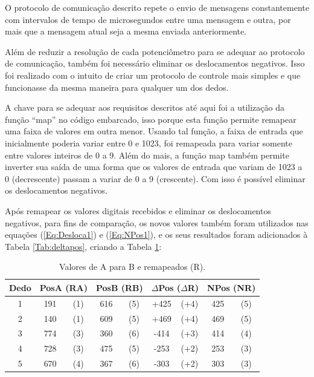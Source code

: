 \documentclass[
	12pt,				%
	openright,			%
	oneside,			%
	a4paper,			%
	english,			%
	brazil				%
	]{abntex2}
\begin{document}
		O protocolo de comunicação descrito repete o envio de mensagens constantemente com intervalos de tempo de microsegundos entre uma mensagem e outra, por mais que a mensagem atual seja a mesma enviada anteriormente.   
		
		Além de reduzir a resolução de cada potenciômetro para se adequar ao protocolo de comunicação, também foi necessário eliminar os deslocamentos negativos. Isso foi realizado com o intuito de criar um protocolo de controle mais simples e que funcionasse da mesma maneira para qualquer um dos dedos.

	 A chave para se adequar aos requisitos descritos até aqui foi a utilização da função ``map'' no código embarcado, isso porque esta função permite remapear uma faixa de valores em outra menor. Usando tal função, a faixa de entrada que inicialmente poderia variar entre 0 e 1023, foi remapeada para variar somente entre valores inteiros de 0 a 9. Além do mais, a função map também permite inverter sua saída de uma forma que os valores de entrada que variam de 1023 a 0 (decrescente) passam a variar de 0 a 9 (crescente). Com isso é possível eliminar os deslocamentos negativos.

	 Após remapear os valores digitais recebidos e eliminar os deslocamentos negativos, para fins de comparação, os novos valores também foram utilizados nas equações (\ref{Eq:Desloca1}) e (\ref{Eq:NPos1}), e os seus resultados foram adicionados à Tabela \ref{Tab:deltapos}, criando a Tabela \ref{Tab:deltaremap}:


	\begin{table}[H]
  	\centering
		\caption{Valores de A para B e remapeados (R).}
    \begin{tabular}{c|cc|cc|cc|cc}
      \midrule
			Dedo	&\multicolumn{2}{c}{PosA	(RA)} 	&\multicolumn{2}{c}{PosB (RB)}	&\multicolumn{2}{c}{$\Delta$Pos	($\Delta$R)}	&\multicolumn{2}{c}{NPos	(NR)}	\\
      \midrule
			1 		& 191 & (1)		& 616 & (5)		& 		+425 & (+4)		&			425	& (5)		\\
			2 		& 140 & (1)		& 609 & (5)		& 		+469 & (+4)		&			469 &	(5)		\\
			3 		& 774 & (3)		& 360 & (6)		& 		-414 & (+3)		&			414	& (4)		\\
			4 		& 728 & (3)		& 475 & (5)		& 		-253 & (+2)		&			253	& (3)		\\
			5 		& 670 & (4)		& 367 & (6)		& 		-303 & (+2)		&			303 &	(3)		\\      
      \midrule
    \end{tabular}
    \label{Tab:deltaremap}
	\end{table}
	
\end{document}
